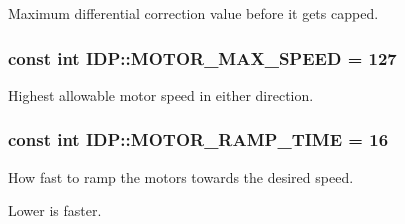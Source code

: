 Maximum differential correction value before it gets capped. 

\hypertarget{namespaceIDP_a4ead0b21ad2c507b542445695182d4cd}{
\subsubsection[{MOTOR\_\-MAX\_\-SPEED}]{\setlength{\rightskip}{0pt plus 5cm}const int {\bf IDP::MOTOR\_\-MAX\_\-SPEED} = 127}}
\label{namespaceIDP_a4ead0b21ad2c507b542445695182d4cd}


Highest allowable motor speed in either direction. 

\hypertarget{namespaceIDP_ab3a00a6cc8a6dba271e38d337daf4703}{
\subsubsection[{MOTOR\_\-RAMP\_\-TIME}]{\setlength{\rightskip}{0pt plus 5cm}const int {\bf IDP::MOTOR\_\-RAMP\_\-TIME} = 16}}
\label{namespaceIDP_ab3a00a6cc8a6dba271e38d337daf4703}


How fast to ramp the motors towards the desired speed. 

Lower is faster. 